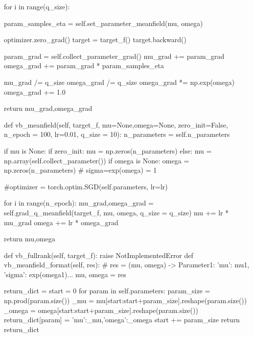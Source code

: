 \documentclass{article}
\begin{document}
\begin{python}
        for i in range(q_size):
            
            param_samples_eta = self.set_parameter_meanfield(mu, omega)
            
            optimizer.zero_grad()
            target = target_f()
            target.backward()
            
            param_grad = self.collect_parameter_grad()
            mu_grad += param_grad
            omega_grad += param_grad * param_samples_eta
        
        mu_grad /= q_size
        omega_grad /= q_size
        omega_grad *= np.exp(omega)
        omega_grad += 1.0
        
        return mu_grad,omega_grad
            
    def vb_meanfield(self, target_f, mu=None,omega=None, zero_init=False, 
                     n_epoch = 100, lr=0.01, q_size = 10):
        n_parameters = self.n_parameters
        
        if mu is None:
            if zero_init:
                mu = np.zeros(n_parameters)
            else:
                mu = np.array(self.collect_parameter())
        if omega is None:
            omega = np.zeros(n_parameters) # sigma=exp(omega) = 1
        
        #optimizer = torch.optim.SGD(self.parameters, lr=lr)
        
        for i in range(n_epoch):
            mu_grad,omega_grad = self.grad_q_meanfield(target_f, mu, omega, q_size = q_size)
            mu += lr * mu_grad
            omega += lr * omega_grad
        
        return mu,omega
        
        
    def vb_fullrank(self, target_f):
        raise NotImplementedError
    def vb_meanfield_format(self, res):
        # res = (mu, omega) -> {Parameter1: {'mu': mu1, 'sigma': exp(omega1)}...}
        mu, omega = res
        
        return_dict = {}
        start = 0
        for param in self.parameters:
            param_size = np.prod(param.size())
            _mu = mu[start:start+param_size].reshape(param.size())
            _omega = omega[start:start+param_size].reshape(param.size())
            return_dict[param] = {'mu':_mu,'omega':_omega}
            start += param_size
        return return_dict


\end{python}
\end{document}
